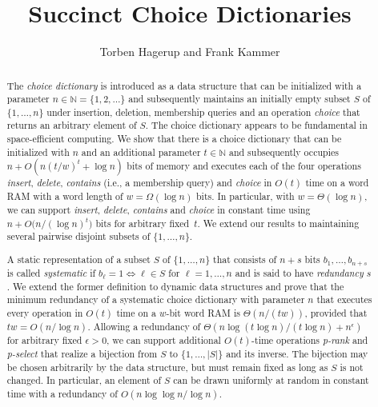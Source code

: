 \documentclass[envcountsame,envcountsect,undated,nolinenumbers]{lnthi}
\title{Succinct Choice Dictionaries}
\author{Torben Hagerup and Frank Kammer}
\institute{Institut f\"ur Informatik, Universit\"at Augsburg, 86135
Augsburg, Germany
\email{\{hagerup,kammer\}@informatik.uni-augsburg.de}}
\def\Tvn#1{\hbox{\textit{#1\/}}}
\def\TbbbN{\mathbb{N}}
\begin{document}
\maketitle{}

\begin{abstract}The \emph{choice dictionary} is introduced as a
data structure that can be initialized
with a parameter $n\in\TbbbN=\{1,2,\ldots\}$
and subsequently maintains an initially empty subset $S$
of $\{1,\ldots,n\}$ under insertion, deletion, membership queries
and an operation \Tvn{choice} that returns
an arbitrary element of $S$.
The choice dictionary appears to be fundamental
in space-efficient computing.
We show that there is a choice dictionary
that can be initialized
with $n$ and an additional parameter $t\in\TbbbN$
and subsequently
occupies $n+O(n({t/w})^t+\log n)$ bits of memory
and executes each of the four operations \Tvn{insert},
\Tvn{delete}, \Tvn{contains} (i.e., a membership query)
and \Tvn{choice} in $O(t)$ time
on a word RAM with a word length of $w=\Omega(\log n)$ bits.
In particular, with $w=\Theta(\log n)$,
we can support \Tvn{insert}, \Tvn{delete},
\Tvn{contains} and \Tvn{choice} in constant time using
$n+O({n/{(\log n)^t})}$ bits for arbitrary fixed~$t$.
We extend our results to maintaining several
pairwise disjoint subsets of $\{1,\ldots,n\}$.

A static representation of a subset $S$ of $\{1,\ldots,n\}$
that consists of $n+s$ bits $b_1,\ldots,b_{n+s}$
is called \emph{systematic} if
$b_\ell=1\Leftrightarrow \ell\in S$ for $\ell=1,\ldots,n$
and is said to have \emph{redundancy} $s$.
We extend the former definition to dynamic data structures
and prove that the minimum redundancy of a systematic choice
dictionary with parameter $n$ that executes
every operation in $O(t)$ time on a
$w$-bit word RAM is $\Theta({n/{(t w)}})$,
provided that $t w=O({n/{\log n}})$.
Allowing
a redundancy of
$\Theta({{n\log(t\log n)}/{(t\log n)}}+n^\epsilon)$
for arbitrary fixed $\epsilon>0$,
we can support additional $O(t)$-time operations
\Tvn{p-rank} and \Tvn{p-select} that
realize a bijection from $S$ to $\{1,\ldots,|S|\}$
and its inverse.
The bijection may be chosen arbitrarily by the
data structure, but must remain fixed
as long as $S$ is not changed.
In particular, an element of $S$ can be
drawn uniformly at random in constant time
with a redundancy of $O({{n\log\log n}/{\log n}})$.


\end{abstract}
\end{document}
